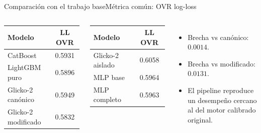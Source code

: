 \documentclass[aspectratio=169,11pt]{beamer}
\begin{document}
\begin{frame}{Comparaci\'on con el trabajo base}{M\'etrica com\'un: OVR log-loss}
	\vspace*{-0.4cm}
	\begin{columns}[T,onlytextwidth]
		\par\vskip 2mm
		\centering
		\scriptsize
		\renewcommand{\arraystretch}{1.3}
		\begin{tabular}{l c}
			\toprule
			\textbf{Modelo} & \textbf{LL OVR} \\
			\midrule
			CatBoost & 0.5931 \\
			LightGBM puro & 0.5896 \\
			Glicko-2 can\'onico & 0.5949 \\
			Glicko-2 modificado & 0.5832 \\
			\bottomrule
		\end{tabular}
		\vskip 1mm
		\par\vskip 2mm
		\centering
		\scriptsize
		\renewcommand{\arraystretch}{1.3}
		\begin{tabular}{l c}
			\toprule
			\textbf{Modelo} & \textbf{LL OVR} \\
			\midrule
			Glicko-2 aislado & 0.6058 \\
			MLP base & 0.5964 \\
			MLP completo & 0.5963 \\
			\bottomrule
		\end{tabular}
		\vskip 1mm
		\par\vskip 2mm
		\footnotesize
		\begin{itemize}
			\item Brecha vs can\'onico: $0{.}0014$.
			\item Brecha vs modificado: $0{.}0131$.
			\item El pipeline reproduce un desempe\~no cercano al del motor calibrado original.
		\end{itemize}
	\end{columns}
\end{frame}
\end{document}

